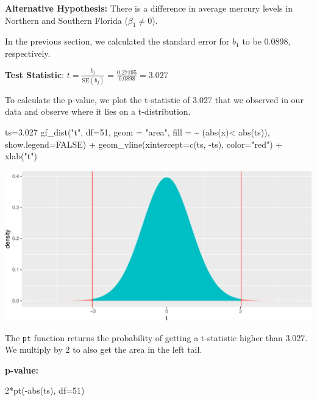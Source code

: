 \documentclass[
  letterpaper,
  DIV=11,
  numbers=noendperiod]{scrreprt}
\newenvironment{Shaded}{\begin{snugshade}}{\end{snugshade}}
\newcommand{\AttributeTok}[1]{\textcolor[rgb]{0.40,0.45,0.13}{#1}}
\newcommand{\ConstantTok}[1]{\textcolor[rgb]{0.56,0.35,0.01}{#1}}
\newcommand{\DecValTok}[1]{\textcolor[rgb]{0.68,0.00,0.00}{#1}}
\newcommand{\FloatTok}[1]{\textcolor[rgb]{0.68,0.00,0.00}{#1}}
\newcommand{\FunctionTok}[1]{\textcolor[rgb]{0.28,0.35,0.67}{#1}}
\newcommand{\NormalTok}[1]{\textcolor[rgb]{0.00,0.23,0.31}{#1}}
\newcommand{\OtherTok}[1]{\textcolor[rgb]{0.00,0.23,0.31}{#1}}
\newcommand{\SpecialCharTok}[1]{\textcolor[rgb]{0.37,0.37,0.37}{#1}}
\newcommand{\StringTok}[1]{\textcolor[rgb]{0.13,0.47,0.30}{#1}}
\begin{document}
\textbf{Alternative Hypothesis:} There is a difference in average
mercury levels in Northern and Southern Florida (\(\beta_1\neq 0\)).

In the previous section, we calculated the standard error for \(b_1\) to
be 0.0898, respectively.

\textbf{Test Statistic}:
\(t=\frac{{b_j}}{\text{SE}(b_j)} = \frac{0.27195}{0.0898} = 3.027\)

To calculate the p-value, we plot the t-statistic of 3.027 that we
observed in our data and observe where it lies on a t-distribution.

\begin{Shaded}
\begin{Highlighting}[]
\NormalTok{ts}\OtherTok{=}\FloatTok{3.027}
\FunctionTok{gf\_dist}\NormalTok{(}\StringTok{"t"}\NormalTok{, }\AttributeTok{df=}\DecValTok{51}\NormalTok{, }\AttributeTok{geom =} \StringTok{"area"}\NormalTok{, }\AttributeTok{fill =} \SpecialCharTok{\textasciitilde{}}\NormalTok{ (}\FunctionTok{abs}\NormalTok{(x)}\SpecialCharTok{\textless{}} \FunctionTok{abs}\NormalTok{(ts)), }\AttributeTok{show.legend=}\ConstantTok{FALSE}\NormalTok{) }\SpecialCharTok{+} \FunctionTok{geom\_vline}\NormalTok{(}\AttributeTok{xintercept=}\FunctionTok{c}\NormalTok{(ts, }\SpecialCharTok{{-}}\NormalTok{ts), }\AttributeTok{color=}\StringTok{"red"}\NormalTok{)  }\SpecialCharTok{+} \FunctionTok{xlab}\NormalTok{(}\StringTok{"t"}\NormalTok{)}
\end{Highlighting}
\end{Shaded}

\includegraphics{Ch4_files/figure-pdf/unnamed-chunk-38-1.pdf}

The \texttt{pt} function returns the probability of getting a
t-statistic higher than 3.027. We multiply by 2 to also get the area in
the left tail.

\textbf{p-value:}

\begin{Shaded}
\begin{Highlighting}[]
\DecValTok{2}\SpecialCharTok{*}\FunctionTok{pt}\NormalTok{(}\SpecialCharTok{{-}}\FunctionTok{abs}\NormalTok{(ts), }\AttributeTok{df=}\DecValTok{51}\NormalTok{)}
\end{Highlighting}
\end{Shaded}
\end{document}
